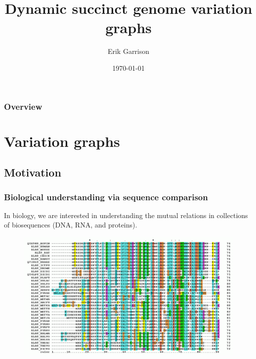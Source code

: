 \documentclass{beamer}
\title[\textsc{dsgvg}]{Dynamic succinct genome variation graphs} %
\author{Erik Garrison} %
\institute[UCSC] %
{
University of California, Santa Cruz \\ %
\medskip
\textit{erik.garrison@gmail.com} %
}
\date{\today} %
\begin{document}
\begin{frame}
\titlepage %
\end{frame}

\begin{frame}
\frametitle{Overview} %
\tableofcontents %
\end{frame}


\section{Variation graphs} %

\subsection{Motivation}

\begin{frame}
  \frametitle{Biological understanding via sequence comparison}
In biology, we are interested in understanding the mutual relations in collections of biosequences (DNA, RNA, and proteins).

\begin{figure}
  \includegraphics[scale=0.2,center]{RPLP0_90_ClustalW_aln.png}
\end{figure}


\end{frame}
\end{document}
